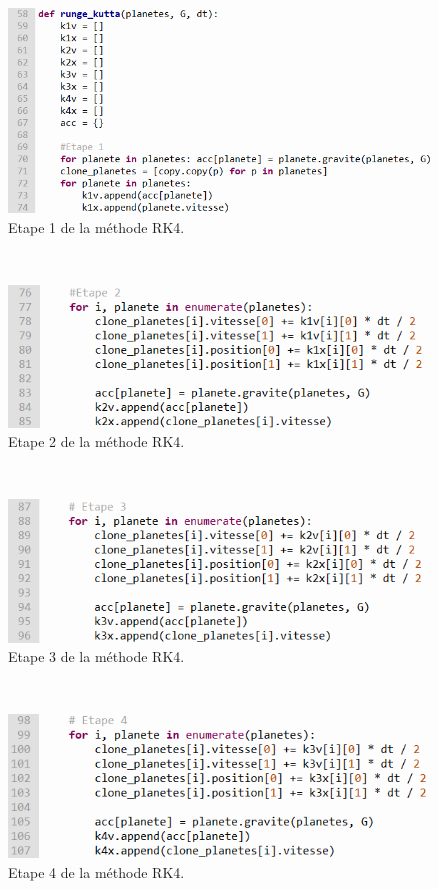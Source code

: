 \documentclass{article}
\begin{document}
            \\

             \begin{figure}[h]
                  \centering
                  \includegraphics[width=0.5\linewidth]{RK4partie1.png}
                 \caption{\label{fig:Git}Etape 1 de la méthode RK4.}
             \end{figure}

            \\

            \begin{figure}[h]
                 \centering
                 \includegraphics[width=0.5\linewidth]{RK4partie2.png}
                 \caption{\label{fig:Git}Etape 2 de la méthode RK4.}
            \end{figure}

             \\

              \begin{figure}[h]
                   \centering
                  \includegraphics[width=0.5\linewidth]{RK4partie3.png}
                  \caption{\label{fig:Git}Etape 3 de la méthode RK4.}
              \end{figure}

            \\

              \begin{figure}[h]
                 \centering
                 \includegraphics[width=0.5\linewidth]{RK4partie4.png}
                 \caption{\label{fig:Git}Etape 4 de la méthode RK4.}
              \end{figure}
\end{document}

